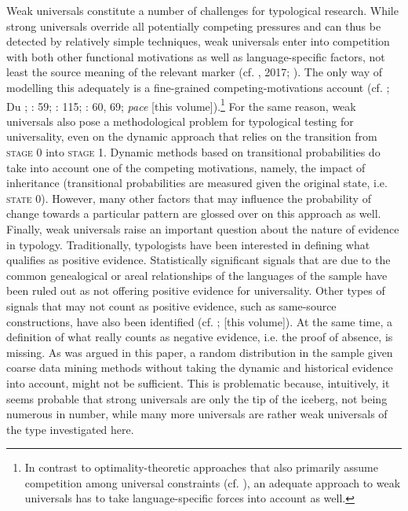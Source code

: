 \documentclass[output=paper]{langsci/langscibook}
\begin{document}
Weak universals constitute a number of challenges for typological research. While strong universals override all potentially competing pressures and can thus be detected by relatively simple techniques, weak universals enter into competition with both other functional motivations as well as language-specific factors, not least the source meaning of the relevant marker (cf. \citealt{Cristofaro2012}, 2017; \citealt{Hammarström2015}). The only way of modelling this adequately is a fine-grained competing-motivations account (cf. \citealt{Haiman1983}; Du \citealt{Bois1985}; \citealt{Croft2003}: 59; \citealt{Bickel2014}: 115; \citealt{Hawkins2014}: 60, 69; \textit{pace} \citealt{Cristofaro2018} [this volume]).\footnote{In contrast to optimality-theoretic approaches that also primarily assume competition among universal constraints (cf. \citealt{Aissen2003}), an adequate approach to weak universals has to take language-specific forces into account as well.} For the same reason, weak universals also pose a methodological problem for typological testing for universality, even on the dynamic approach that relies on the transition from \textsc{stage} 0 into \textsc{stage} 1. Dynamic methods based on transitional probabilities do take into account one of the competing motivations, namely, the impact of inheritance (transitional probabilities are measured given the original state, i.e. \textsc{state 0}). However, many other factors that may influence the probability of change towards a particular pattern are glossed over on this approach as well. Finally, weak universals raise an important question about the nature of evidence in typology. Traditionally, typologists have been interested in defining what qualifies as positive evidence. Statistically significant signals that are due to the common genealogical or areal relationships of the languages of the sample have been ruled out as not offering positive evidence for universality. Other types of signals that may not count as positive evidence, such as same-source constructions, have also been identified (cf. \citealt{Cristofaro2017}; \citealt{Collins2018} [this volume]). At the same time, a definition of what really counts as negative evidence, i.e. the proof of absence, is missing. As was argued in this paper, a random distribution in the sample given coarse data mining methods without taking the dynamic and historical evidence into account, might not be sufficient. This is problematic because, intuitively, it seems probable that strong universals are only the tip of the iceberg, not being numerous in number, while many more universals are rather weak universals of the type investigated here. 
\end{document}
